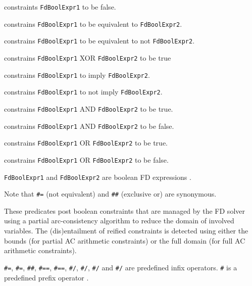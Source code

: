 \Description

 constraints \texttt{FdBoolExpr1} to be
false.

 constrains
\texttt{FdBoolExpr1} to be equivalent to \texttt{FdBoolExpr2}.

 constrains
\texttt{FdBoolExpr1} to be equivalent to not \texttt{FdBoolExpr2}.

 constrains \texttt{FdBoolExpr1} XOR
\texttt{FdBoolExpr2} to be true

 constrains
\texttt{FdBoolExpr1} to imply \texttt{FdBoolExpr2}.

 constrains
\texttt{FdBoolExpr1} to not imply \texttt{FdBoolExpr2}.

 constrains \texttt{FdBoolExpr1}
AND \texttt{FdBoolExpr2} to be true.

 constrains
\texttt{FdBoolExpr1} AND \texttt{FdBoolExpr2} to be false.

 constrains \texttt{FdBoolExpr1}
OR \texttt{FdBoolExpr2} to be true.

 constrains
\texttt{FdBoolExpr1} OR \texttt{FdBoolExpr2} to be false.

\texttt{FdBoolExpr1} and \texttt{FdBoolExpr2} are boolean FD expressions
.

Note that \texttt{\#{\bs}{\lt}={\gt}} (not equivalent) and \texttt{\#\#}
(exclusive or) are synonymous.

These predicates post boolean constraints that are managed by the FD solver
using a partial arc-consistency algorithm to reduce the domain of involved
variables. The (dis)entailment of reified constraints is detected using
either the bounds (for partial AC arithmetic constraints) or the full domain
(for full AC arithmetic constraints).

\texttt{\#{\lt}={\gt}}, \texttt{\#{\bs}{\lt}={\gt}}, \texttt{\#\#},
\texttt{\#=={\gt}}, \texttt{\#{\bs}=={\gt}}, \texttt{\#/{\bs}},
\texttt{\#{\bs}/{\bs}}, \texttt{\#{\bs}/} and \texttt{\#{\bs}{\bs}/} are
predefined infix operators. \texttt{\#{\bs}} is a predefined prefix operator
.

